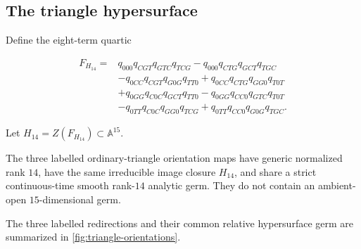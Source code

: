 \subsection{The triangle hypersurface}

Define the eight-term quartic

\begin{align}\label{eq:H14}
F_{H_{14}}={}&
 q_{000}q_{CGT}q_{GTC}q_{TCG}
-q_{000}q_{CTG}q_{GCT}q_{TGC}\nonumber\\
&-q_{0CC}q_{CGT}q_{G0G}q_{TT0}
+q_{0CC}q_{CTG}q_{GG0}q_{T0T}\nonumber\\
&+q_{0GG}q_{C0C}q_{GCT}q_{TT0}
-q_{0GG}q_{CC0}q_{GTC}q_{T0T}\nonumber\\
&-q_{0TT}q_{C0C}q_{GG0}q_{TCG}
+q_{0TT}q_{CC0}q_{G0G}q_{TGC}.
\end{align}

Let \(H_{14}=Z(F_{H_{14}})\subset\mathbb A^{15}\).

\begin{theorem}\label{thm:H14}
The three labelled ordinary-triangle orientation maps have generic
normalized rank \(14\), have the same irreducible image closure \(H_{14}\),
and share a strict continuous-time smooth rank-\(14\) analytic germ.  They do
not contain an ambient-open \(15\)-dimensional germ.
\end{theorem}



The three labelled redirections and their common relative hypersurface germ
are summarized in \cref{fig:triangle-orientations}.

